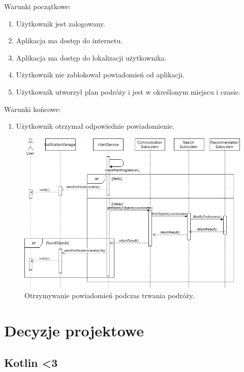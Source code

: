 \documentclass[10pt,twoside,a4paper]{report}
\begin{document}
\noindent\newline Warunki początkowe:
\begin{enumerate}
  \item Użytkownik jest zalogowany.
  \item Aplikacja ma dostęp do internetu.
  \item Aplikacja ma dostęp do lokalizacji użytkownika.
  \item Użytkownik nie zablokował powiadomień od aplikacji.
  \item Użytkownik utworzył plan podróży i jest w określonym miejscu i czasie.
\end{enumerate}
\par
\noindent\newline
Warunki końcowe:
\begin{enumerate}
  \item Użytkownik otrzymał odpowiednie powiadomienie.
\end{enumerate}

\noindent\newline
\begin{figure}[h]
\centering
\includegraphics[width=\linewidth]{whileTravelling}
\caption{Otrzymywanie powiadomień podczas trwania podróży.}
\label{fig:whileTravelling}
\end{figure}

\chapter{Decyzje projektowe}

\section{Kotlin <3}
\end{document}
